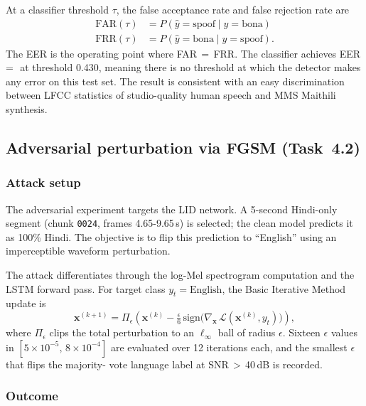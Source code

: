 \documentclass[10pt,twocolumn,letterpaper]{article}
\begin{document}
At a classifier threshold $\tau$, the false acceptance rate and false
rejection rate are
\begin{align}
  \mathrm{FAR}(\tau) &= P(\hat{y}=\mathrm{spoof}\mid y=\mathrm{bona}) \\
  \mathrm{FRR}(\tau) &= P(\hat{y}=\mathrm{bona}\mid y=\mathrm{spoof}).
  \label{eq:farfrr}
\end{align}
The EER is the operating point where FAR\,$=$\,FRR.  The classifier
achieves EER\,=\,\SpoofEER\ at threshold 0.430, meaning there is no
threshold at which the detector makes any error on this test set.
The result is consistent with an easy discrimination between LFCC
statistics of studio-quality human speech and MMS Maithili synthesis.

\subsection{Adversarial perturbation via FGSM (Task~4.2)}
\label{sec:fgsm}

\subsubsection{Attack setup}
The adversarial experiment targets the LID network.  A 5-second
Hindi-only segment (chunk \texttt{0024}, frames 4.65-9.65\,s) is
selected; the clean model predicts it as 100\% Hindi.  The objective
is to flip this prediction to ``English'' using an imperceptible
waveform perturbation.

The attack differentiates through the log-Mel spectrogram computation
and the LSTM forward pass.  For target class $y_t=\text{English}$,
the Basic Iterative Method update is
\begin{equation}
  \mathbf{x}^{(k+1)}
  = \Pi_\epsilon\!\left(
      \mathbf{x}^{(k)}
      - \tfrac{\epsilon}{6}\,
        \mathrm{sign}\!\bigl(\nabla_{\mathbf{x}}\,
        \mathcal{L}(\mathbf{x}^{(k)}, y_t)\bigr)
    \right),
  \label{eq:bim}
\end{equation}
where $\Pi_\epsilon$ clips the total perturbation to an $\ell_\infty$
ball of radius $\epsilon$.  Sixteen $\epsilon$ values in
$[5\!\times\!10^{-5},\,8\!\times\!10^{-4}]$ are evaluated over 12
iterations each, and the smallest $\epsilon$ that flips the majority-
vote language label at SNR\,$>$\,40\,dB is recorded.

\subsubsection{Outcome}
\end{document}
